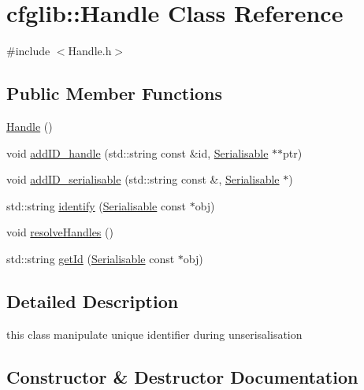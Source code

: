 \hypertarget{classcfglib_1_1Handle}{}\section{cfglib\+:\+:Handle Class Reference}
\label{classcfglib_1_1Handle}


{\ttfamily \#include $<$Handle.\+h$>$}

\subsection*{Public Member Functions}
\begin{DoxyCompactItemize}
\item 
\hyperlink{classcfglib_1_1Handle_a98f8601f6e1dd65a9f9ba0e29254c1ce}{Handle} ()
\item 
void \hyperlink{classcfglib_1_1Handle_ab8a43d033b2fe3a68aecf4dbee61dba2}{add\+I\+D\+\_\+handle} (std\+::string const \&id, \hyperlink{classcfglib_1_1Serialisable}{Serialisable} $\ast$$\ast$ptr)
\item 
void \hyperlink{classcfglib_1_1Handle_ad50bcb573b09ca46cccd3ac988a653d0}{add\+I\+D\+\_\+serialisable} (std\+::string const \&, \hyperlink{classcfglib_1_1Serialisable}{Serialisable} $\ast$)
\item 
std\+::string \hyperlink{classcfglib_1_1Handle_afdd041bbbaea61823ad61918ceaad330}{identify} (\hyperlink{classcfglib_1_1Serialisable}{Serialisable} const $\ast$obj)
\item 
void \hyperlink{classcfglib_1_1Handle_a8f524a2c4b97e7e3dda8aaa0d6dcd577}{resolve\+Handles} ()
\item 
std\+::string \hyperlink{classcfglib_1_1Handle_a90922bce066e04b5d46df9d29b641840}{get\+Id} (\hyperlink{classcfglib_1_1Serialisable}{Serialisable} const $\ast$obj)
\end{DoxyCompactItemize}


\subsection{Detailed Description}
this class manipulate unique identifier during unserisalisation 

\subsection{Constructor \& Destructor Documentation}
\mbox{\label{classcfglib_1_1Handle_a98f8601f6e1dd65a9f9ba0e29254c1ce}} 
